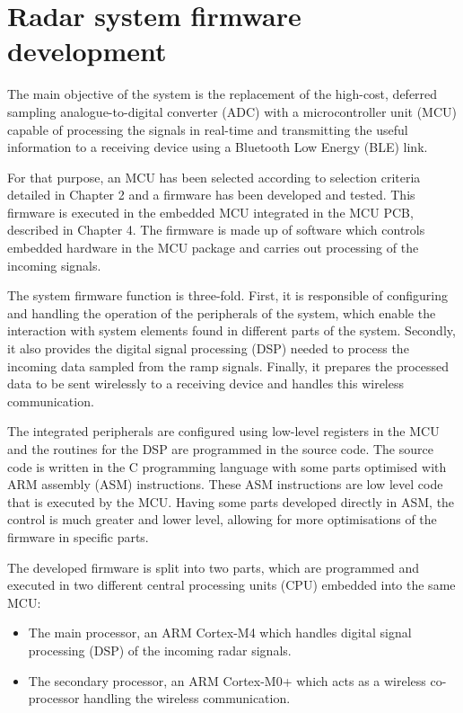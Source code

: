\chapter{Radar system firmware development}\label{sec:radar-system-firmware-development}
The main objective of the system is the replacement of the high-cost, deferred sampling analogue-to-digital converter (ADC) with a microcontroller unit (MCU) capable of processing the signals in real-time and transmitting the useful information to a receiving device using a Bluetooth Low Energy (BLE) link.

For that purpose, an MCU has been selected according to selection criteria detailed in Chapter 2 and a firmware has been developed and tested. This firmware is executed in the embedded MCU integrated in the MCU PCB, described in Chapter 4. %
The firmware is made up of software which controls embedded hardware in the MCU package and carries out processing of the incoming signals.

The system firmware function is three-fold. First, it is responsible of configuring and handling the operation of the peripherals of the system, which enable the interaction with system elements found in different parts of the system. Secondly, it also provides the digital signal processing (DSP) needed to process the incoming data sampled from the ramp signals. Finally, it prepares the processed data to be sent wirelessly to a receiving device and handles this wireless communication.

The integrated peripherals are configured using low-level registers in the MCU \cite{STMicroelectronics2022, STMicroelectronics2022a} and the routines for the DSP are programmed in the source code. The source code is written in the C programming language with some parts optimised with ARM assembly (ASM) instructions. These ASM instructions are low level code that is executed by the MCU. Having some parts developed directly in ASM, the control is much greater and lower level, allowing for more optimisations of the firmware in specific parts.

The developed firmware is split into two parts, which are programmed and executed in two different central processing units (CPU) embedded into the same MCU:
\begin{itemize}
	\item The main processor, an ARM Cortex-M4 \cite{ARMM4} which handles digital signal processing (DSP) of the incoming radar signals.
	\item The secondary processor, an ARM Cortex-M0+ \cite{ARMM0} which acts as a wireless co-processor handling the wireless communication.
\end{itemize}

